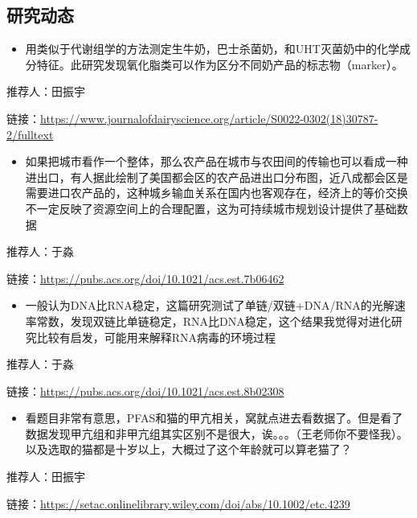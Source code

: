 \documentclass[
]{book}
\providecommand{\tightlist}{%
  \setlength{\itemsep}{0pt}\setlength{\parskip}{0pt}}
\begin{document}
\hypertarget{ux7814ux7a76ux52a8ux6001-10}{%
\subsection*{研究动态}\label{ux7814ux7a76ux52a8ux6001-10}}

\begin{itemize}
\tightlist
\item
  用类似于代谢组学的方法测定生牛奶，巴士杀菌奶，和UHT灭菌奶中的化学成分特征。此研究发现氧化脂类可以作为区分不同奶产品的标志物（marker）。
\end{itemize}

推荐人：田振宇

链接：\url{https://www.journalofdairyscience.org/article/S0022-0302(18)30787-2/fulltext}

\begin{itemize}
\tightlist
\item
  如果把城市看作一个整体，那么农产品在城市与农田间的传输也可以看成一种进出口，有人据此绘制了美国都会区的农产品进出口分布图，近八成都会区是需要进口农产品的，这种城乡输血关系在国内也客观存在，经济上的等价交换不一定反映了资源空间上的合理配置，这为可持续城市规划设计提供了基础数据
\end{itemize}

推荐人：于淼

链接：\url{https://pubs.acs.org/doi/10.1021/acs.est.7b06462}

\begin{itemize}
\tightlist
\item
  一般认为DNA比RNA稳定，这篇研究测试了单链/双链+DNA/RNA的光解速率常数，发现双链比单链稳定，RNA比DNA稳定，这个结果我觉得对进化研究比较有启发，可能用来解释RNA病毒的环境过程
\end{itemize}

推荐人：于淼

链接：\url{https://pubs.acs.org/doi/10.1021/acs.est.8b02308}

\begin{itemize}
\tightlist
\item
  看题目非常有意思，PFAS和猫的甲亢相关，窝就点进去看数据了。但是看了数据发现甲亢组和非甲亢组其实区别不是很大，诶。。。（王老师你不要怪我）。以及选取的猫都是十岁以上，大概过了这个年龄就可以算老猫了？
\end{itemize}

推荐人：田振宇

链接：\url{https://setac.onlinelibrary.wiley.com/doi/abs/10.1002/etc.4239}
\end{document}
